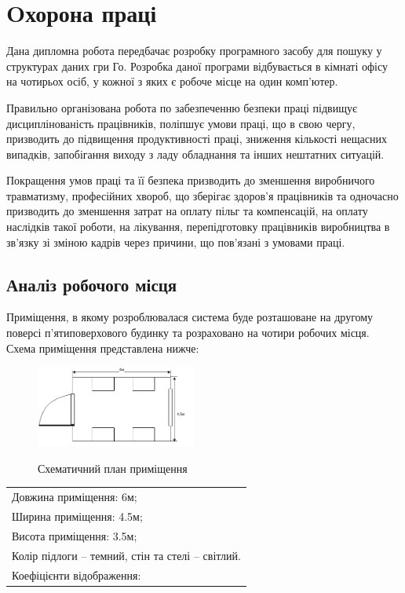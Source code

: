 \newpage
\section{Oхорона праці}
Дана дипломна робота передбачає розробку програмного засобу для пошуку у структурах даних гри Го.  Розробка даної програми відбувається в кімнаті офісу на чотирьох осіб, у кожної з яких є робоче місце на один комп’ютер.

Правильно організована робота по забезпеченню безпеки праці підвищує дисциплінованість працівників, поліпшує умови праці, що в свою чергу, призводить до підвищення продуктивності праці, зниження кількості нещасних випадків, запобігання  виходу з ладу обладнання та інших нештатних ситуацій.

Покращення умов праці та її безпека призводить до зменшення виробничого травматизму, професійних хвороб, що зберігає здоров’я працівників та одночасно призводить до зменшення затрат на оплату пільг та компенсацій, на оплату наслідків такої роботи, на лікування, перепідготовку працівників виробництва в зв’язку зі зміною кадрів через причини, що пов’язані з умовами праці.
\subsection{Аналіз робочого місця}
Приміщення, в якому розроблювалася система буде розташоване на другому поверсі п'ятиповерхового будинку та розраховано на чотири робочих місця. Схема приміщення представлена нижче:

\begin{figure}[H]
	\centering
	\caption{Схематичний план приміщення}
	\includegraphics[width=150pt]{safety_room_plan}
	\label{fig:safety_room_plan}
\end{figure}

\begin{tabular}{l}
	Довжина приміщення: 6м;\\
	Ширина приміщення: 4.5м;\\
	Висота приміщення: 3.5м;\\
	Колір підлоги – темний, стін та стелі – світлий.\\
	Коефіцієнти відображення:
\end{tabular}

